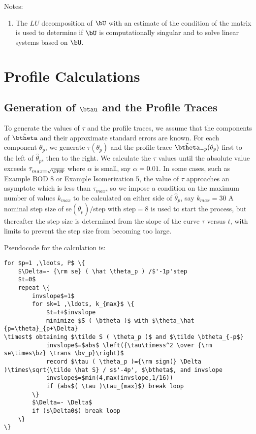 {Notes:
\begin{enumerate}
\item The $LU$ decomposition \cite[Chapter
  1]{dong:bunc:mole:stew:1979} of  $\bU$ with an 
estimate of the condition of the matrix is used to determine if $\bU$
is computationally singular and to solve linear systems based on $\bU$.
\end{enumerate}

\section{Profile Calculations}

\subsection{Generation of $\btau$ and the Profile Traces}

To generate the values of $\tau$ and the profile traces, we assume that
the components of $\hat \btheta$ and their approximate standard errors
are known.
For each component $\theta_{p}$, we generate $\tau ( \theta_p )$ and
the profile trace $\tilde \btheta_{-p} ( \theta_p )$ first to the left
of $\hat \theta_{p}$, then to the right.
We calculate the $\tau$ values until the absolute value exceeds
$\tau_{max=\sqrt{\FPNP}}$ where $\alpha$ is small, say $\alpha=0.01$.
In some cases, such as Example BOD 8 or Example Isomerization 5, the
value of $\tau$ approaches an asymptote which is less than
$\tau_{max}$, so we impose a condition on the maximum number of values
$k_{max}$ to be calculated on either side of $\hat \theta_{p}$, say
$k_{max} = 30$  A nominal step size of se$( \hat \theta_p ) /$step 
with step$=8$ is used to start the process, but thereafter the
step size is determined from the slope of the curve $\tau$ versus $t$,
with limits to prevent the step size from becoming too large.

Pseudocode for the calculation is:
\begin{verbatim}
for $p=1 ,\ldots, P$ \{
    $\Delta=- {\rm se} ( \hat \theta_p ) /$'-1p'step
    $t=0$
    repeat \{
        invslope$=1$
        for $k=1 ,\ldots, k_{max}$ \{
            $t=t+$invslope
            minimize $S ( \btheta )$ with $\theta_\hat {p=\theta}_{p+\Delta}
\timest$ obtaining $\tilde S ( \theta_p )$ and $\tilde \btheta_{-p$}
            invslope$=$abs$ \left({\tau\timess^2 \over {\rm se\times\bz} \trans \bv_p}\right)$
            record $\tau ( \theta_p )={\rm sign(} \Delta )\times\sqrt{\tilde \hat S} / s$'-4p', $\btheta$, and invslope
            invslope$=$min(4,max(invslope,1/16))
            if (abs$( \tau )\tau_{max}$) break loop
        \}
        $\Delta=- \Delta$
        if ($\Delta0$) break loop
    \}
\}
\end{verbatim}

}
